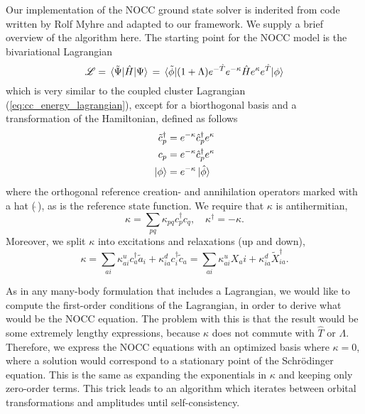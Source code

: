     Our implementation of the NOCC ground state solver is inderited from code written by Rolf Myhre and 
    adapted to our 
    framework. We supply a brief overview of the algorithm here. The starting point for the 
    NOCC model is the bivariational Lagrangian
    \begin{equation}
        \label{eq:nocc_lagrangian}
        \mathscr{L} = \mel*{\tilde{\Psi}}{\hat{H}}{\Psi} \\
            = \mel*{\tilde{\phi}}
                {
                (1 + \Lambda) e^{-\hat{T}}e^{-\kappa}\hat{H}e^{\kappa}e^{\hat{T}}
                }{\phi}
    \end{equation}
    which is very similar to the coupled cluster Lagrangian (\autoref{eq:cc_energy_lagrangian}),
    except for a biorthogonal basis and a transformation of the Hamiltonian, defined 
    as follows
    \begin{equation}
        \begin{aligned}
            \tilde{c}_p^\dagger &= e^{-\kappa}\hat{c}_p^\dagger e^\kappa \\
            c_p &= e^{-\kappa} \hat{c}_p^\dagger e^\kappa \\
            \ket{\phi} &= e^{-\kappa}\ket*{\hat{\phi}}
        \end{aligned}
    \end{equation}
    where the orthogonal reference creation- and annihilation operators marked with a hat
    ($\hat{\ }$), as is the reference state function. We require that $\kappa$ is antihermitian,
    \begin{equation}
        \kappa = \sum_{pq} \kappa_{pq}c^\dagger_p c_q, \quad \kappa^\dagger = -\kappa.
    \end{equation}
    Moreover, we split $\kappa$ into excitations and relaxations (up and down),
    \begin{equation}
        \label{eq:agg_kappa}
        \kappa = \sum_{ai} \kappa^u_{ai}c^\dagger_a \tilde{a}_i
            + \kappa^d_{ia} c^\dagger_i \tilde{c}_a
            = \sum_{ai} \kappa^u_{ai} X_ai + \kappa^d_{ia} \tilde{X}^\dagger_{ia}.
    \end{equation} 
    
    As in any many-body formulation that includes a Lagrangian, we would like to compute 
    the first-order conditions of the Lagrangian, in order to derive what would be the 
    NOCC equation. The problem with this is that the result would be some extremely 
    lengthy expressions, because $\kappa$ does not commute with $\hat{T}$ or $\Lambda$.
    Therefore, we express the NOCC equations with an optimized basis where $\kappa=0$,
    where a solution would correspond to a stationary point of the Schrödinger equation.
    This is the same as expanding the exponentials in $\kappa$ and keeping only zero-order 
    terms. This trick leads to an algorithm which iterates between orbital transformations 
    and amplitudes until self-consistency.

